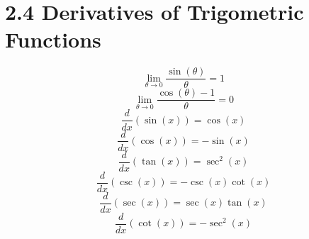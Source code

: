 %
%

\section*{2.4 Derivatives of Trigometric Functions}

\[ \lim_{\theta \to 0} \frac{\sin(\theta)}{\theta}=1 \]
\[ \lim_{\theta \to 0} \frac{\cos(\theta)-1}{\theta}=0 \]
\[ \frac{d}{dx}(\sin(x))=\cos(x) \]
\[ \frac{d}{dx}(\cos(x))=-\sin(x) \]
\[ \frac{d}{dx}(\tan(x))=\sec^2(x) \]
\[ \frac{d}{dx}(\csc(x))=-\csc(x)\cot(x) \]
\[ \frac{d}{dx}(\sec(x))=\sec(x)\tan(x) \]
\[ \frac{d}{dx}(\cot(x))=-\sec^2(x) \]
